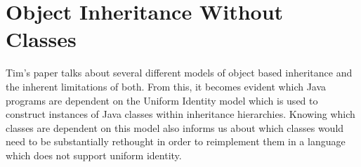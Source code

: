 \section{Object Inheritance Without Classes~\cite{InheritanceWithoutClasses}}
Tim's paper talks about several different models of object based inheritance and the inherent limitations of both. From this, it becomes evident which Java programs are dependent on the Uniform Identity model which is used to construct instances of Java classes within inheritance hierarchies. Knowing which classes are dependent on this model also informs us about which classes would need to be substantially rethought in order to reimplement them in a language which does not support uniform identity.
